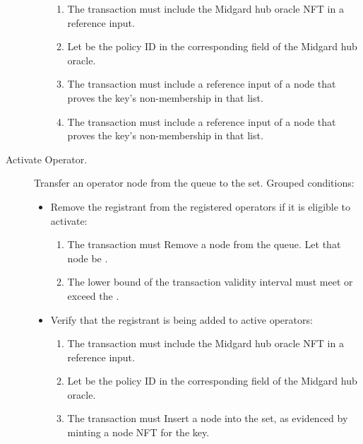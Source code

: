 \documentclass[../midgard.tex]{subfiles}
\begin{document}
\begin{description}
\begin{itemize}
            \begin{enumerate}[resume]
                \item The transaction must include the Midgard hub oracle NFT in a reference input.
                \item Let  be the policy ID in the corresponding field of the Midgard hub oracle.
                \item The transaction must include a reference input of a  node that proves the  key's non-membership in that list.
                \item The transaction must include a reference input of a  node that proves the  key's non-membership in that list.
            \end{enumerate}
        \end{itemize}
    \item[Activate Operator.] Transfer an operator node from the  queue to the  set.
      Grouped conditions:
        \begin{itemize}
            \item Remove the registrant from the registered operators if it is eligible to activate:
            \begin{enumerate}
                \item The transaction must Remove a node from the  queue.
                  Let that node be .
                \item The lower bound of the transaction validity interval must meet or exceed the .
            \end{enumerate}
            \item Verify that the registrant is being added to active operators:
            \begin{enumerate}[resume]
                \item The transaction must include the Midgard hub oracle NFT in a reference input.
                \item Let  be the policy ID in the corresponding field of the Midgard hub oracle.
                \item The transaction must Insert a node into the  set, as evidenced by minting a  node NFT for the  key.
            \end{enumerate}

\end{itemize}
\end{description}
\end{document}
